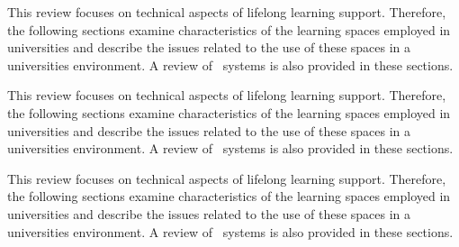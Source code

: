 This review focuses on technical aspects of lifelong learning support.
Therefore, the following sections examine characteristics of the learning spaces
employed in universities and describe the issues related to the use of these
spaces in a universities environment. A review of \ep~systems is also
provided in these sections.

This review focuses on technical aspects of lifelong learning support.
Therefore, the following sections examine characteristics of the learning spaces
employed in universities and describe the issues related to the use of these
spaces in a universities environment. A review of \ep~systems is also
provided in these sections.

This review focuses on technical aspects of lifelong learning support.
Therefore, the following sections examine characteristics of the learning spaces
employed in universities and describe the issues related to the use of these
spaces in a universities environment. A review of \ep~systems is also
provided in these sections.